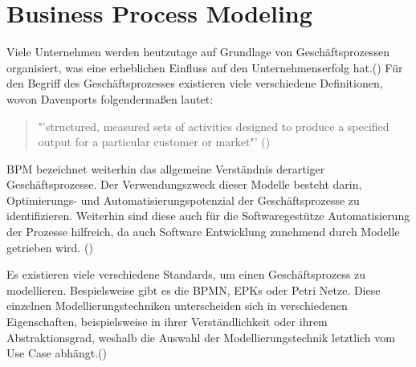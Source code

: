 \section{Business Process Modeling}
Viele Unternehmen werden heutzutage auf Grundlage von Geschäftsprozessen organisiert, was eine erheblichen Einfluss auf den Unternehmenserfolg hat.(\cite[vgl.][1]{BPM2}) Für den Begriff des Geschäftsprozesses existieren viele verschiedene Definitionen, wovon Davenports folgendermaßen lautet: 
\begin{quote}
"'structured, measured sets of activities designed to produce a specified output for a particular customer or market"' (\cite[5]{DAVENPORT})
\end{quote} \ac{BPM} bezeichnet weiterhin das allgemeine Verständnis derartiger Geschäftsprozesse. Der Verwendungszweck dieser Modelle besteht darin, Optimierungs- und Automatisierungspotenzial der Geschäftsprozesse zu identifizieren. Weiterhin sind diese auch für die Softwaregestütze Automatisierung der Prozesse hilfreich, da auch Software Entwicklung zunehmend durch Modelle getrieben wird. (\cite[vgl.][74]{BPM})\par
Es existieren viele verschiedene Standards, um einen Geschäftsprozess zu modellieren. Bespielsweise gibt es die \ac{BPMN}, EPKs oder Petri Netze. Diese einzelnen Modellierungstechniken unterscheiden sich in verschiedenen Eigenschaften, beispielsweise in ihrer Verständlichkeit oder ihrem Abstraktionsgrad, weshalb die Auswahl der Modellierungstechnik letztlich vom Use Case abhängt.(\cite[vgl.][75]{BPM2})
